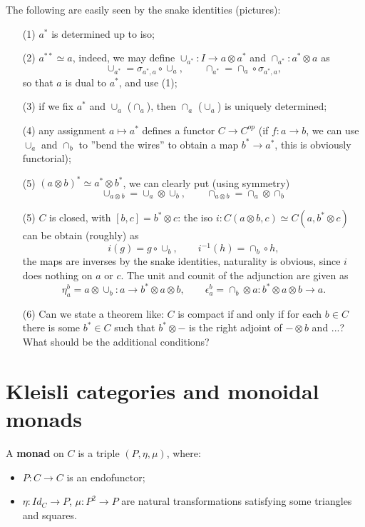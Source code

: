 \documentclass[12pt]{article}
\theoremstyle{definition}
\theoremstyle{remark}
\begin{document}
The following are easily seen by the snake identities (pictures):
\begin{itemize}
\item[(1)] $a^*$ is determined up to iso;
\item[(2)] $a^{**}\simeq a$, indeed, we may define $\cup_{a^*}: I\to a\otimes a^*$ and
$\cap_{a^*}: a^*\otimes a$ as
\[
\cup_{a^*}=\sigma_{a^*,a}\circ \cup_a,\qquad \cap_{a^*}=\cap_a\circ \sigma_{a^*,a},
\]
so that $a$ is dual to $a^*$, and use (1);
\item[(3)] if we fix $a^*$ and $\cup_a$ ($\cap_a$), then  $\cap_a$ ($\cup_a$) is uniquely
determined;
\item[(4)] any assignment $a\mapsto a^*$ defines a functor $C\to C^{op}$ (if $f:a\to b$,
we can use $\cup_a$ and $\cap_b$ to ''bend the wires'' to obtain a map $b^*\to a^*$, this
is obviously functorial);
\item[(5)] $(a\otimes b)^*\simeq a^*\otimes b^*$, we can clearly put (using symmetry)
\[
\cup_{a\otimes b}=\cup_a\otimes \cup_b,\qquad \cap_{a\otimes b}=\cap_a\otimes \cap_b
\]
\item[(5)] $C$ is closed, with $[b,c]=b^*\otimes c$: the iso $i: C(a\otimes b,c)\simeq
C(a,b^*\otimes c)$ can be obtain (roughly) as
\[
i(g)=g\circ \cup_b,\qquad i^{-1}(h)=\cap_b\circ h,
\]
the maps are inverses by the snake identities, naturality is obvious, since $i$ does
nothing on $a$ or $c$. The unit and counit of the adjunction are given as
\[
\eta^b_a=a\otimes \cup_b : a\to b^*\otimes a\otimes b,\qquad \epsilon^b_a=\cap_b\otimes a:
b^*\otimes a\otimes b\to a.
\]
\item[(6)] Can we state a theorem like:  $C$ is compact if and only if for each $b\in C$
there is some $b^*\in C$ such that $b^*\otimes -$ is the right adjoint of $-\otimes b$ and
...? What should be the additional conditions?

\end{itemize}


\section{Kleisli categories and monoidal monads} 

A \textbf{monad} on $C$ is a triple $(P,\eta,\mu)$, where:
\begin{itemize}
\item $P: C\to C$ is an endofunctor;

\item $\eta: Id_C\to P$, $\mu: P^2\to P$ are natural transformations satisfying some
triangles and squares.
\end{itemize}
\end{document}
